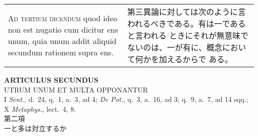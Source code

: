 \documentclass[10pt]{jsarticle} %
\begin{document}
\begin{longtable}{p{21em}p{21em}}
\\


{\scshape Ad tertium dicendum} quod ideo non est nugatio cum dicitur ens
unum, quia unum addit aliquid secundum rationem supra ens.

&


第三異論に対しては次のように言われるべきである。有は一であると言われる
ときにそれが無意味でないのは、一が有に、概念において何かを加えるからで
ある。


\end{longtable}


\newpage
{}

\begin{center}
 {\Large {\bf ARTICULUS SECUNDUS}}\\
 {\large UTRUM UNUM ET MULTA OPPONANTUR}\\
 {\footnotesize I {\itshape Sent.}, d.~24, q.~1, a.~3, ad 4; {\itshape
 De Pot.}, q.~3, a.~16, ad 3; q.~9, a.~7, ad 14 sqq.; X {\itshape
 Metaphys.}, lect.~4, 8.}\\
 {\Large 第二項\\一と多は対立するか}
\end{center}
\end{document}
